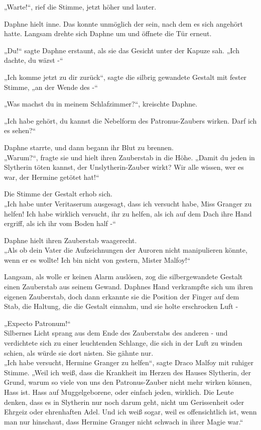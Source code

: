{„Warte!“, rief die Stimme, jetzt höher und lauter.

Daphne hielt inne. Das konnte unmöglich der sein, nach dem es sich angehört hatte. Langsam drehte sich Daphne um und öffnete die Tür erneut.

„Du!“ sagte Daphne erstaunt, als sie das Gesicht unter der Kapuze sah. „Ich dachte, du wärst -“

„Ich komme jetzt zu dir zurück“, sagte die silbrig gewandete Gestalt mit fester Stimme, „an der Wende des -“

„Was machst du in meinem Schlafzimmer?“, kreischte Daphne.

„Ich habe gehört, du kannst die Nebelform des Patronus-Zaubers wirken. Darf ich es sehen?“

Daphne starrte, und dann begann ihr Blut zu brennen.\\ „Warum?“, fragte sie und hielt ihren Zauberstab in die Höhe. „Damit du jeden in Slytherin töten kannst, der Unslytherin-Zauber wirkt? Wir alle wissen, wer es war, der Hermine getötet hat!“

Die Stimme der Gestalt erhob sich.\\ „Ich habe unter Veritaserum ausgesagt, dass ich versucht habe, Miss Granger zu helfen! Ich habe wirklich versucht, ihr zu helfen, als ich auf dem Dach ihre Hand ergriff, als ich ihr vom Boden half -“

Daphne hielt ihren Zauberstab waagerecht.\\ „Als ob dein Vater die Aufzeichnungen der Auroren nicht manipulieren könnte, wenn er es wollte! Ich bin nicht von gestern, Mister Malfoy!“

Langsam, als wolle er keinen Alarm auslösen, zog die silbergewandete Gestalt einen Zauberstab aus seinem Gewand. Daphnes Hand verkrampfte sich um ihren eigenen Zauberstab, doch dann erkannte sie die Position der Finger auf dem Stab, die Haltung, die die Gestalt einnahm, und sie holte erschrocken Luft -

„Expecto Patronum!“\\ Silbernes Licht sprang aus dem Ende des Zauberstabs des anderen - und verdichtete sich zu einer leuchtenden Schlange, die sich in der Luft zu winden schien, als würde sie dort nisten. Sie gähnte nur.\\ „Ich habe versucht, Hermine Granger zu helfen“, sagte Draco Malfoy mit ruhiger Stimme. „Weil ich weiß, dass die Krankheit im Herzen des Hauses Slytherin, der Grund, warum so viele von uns den Patronus-Zauber nicht mehr wirken können, Hass ist. Hass auf Muggelgeborene, oder einfach jeden, wirklich. Die Leute denken, dass es in Slytherin nur noch darum geht, nicht um Gerissenheit oder Ehrgeiz oder ehrenhaften Adel. Und ich weiß sogar, weil es offensichtlich ist, wenn man nur hinschaut, dass Hermine Granger nicht schwach in ihrer Magie war.“

}
